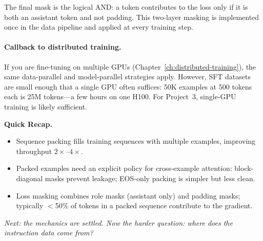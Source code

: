 The final mask is the logical AND: a token contributes to the loss only if it is both an assistant token and not padding. This two-layer masking is implemented once in the data pipeline and applied at every training step.

\noindent{}

\paragraph{Callback to distributed training.} If you are fine-tuning on multiple GPUs (Chapter~\ref{ch:distributed-training}), the same data-parallel and model-parallel strategies apply. However, SFT datasets are small enough that a single GPU often suffices: 50K examples at 500 tokens each is 25M tokens---a few hours on one H100. For Project~3, single-GPU training is likely sufficient.

\begin{quickrecap}
\textbf{Quick Recap.}
\begin{itemize}[nosep,leftmargin=1.5em]
  \item Sequence packing fills training sequences with multiple examples, improving throughput $2\times$--$4\times$.
  \item Packed examples need an explicit policy for cross-example attention: block-diagonal masks prevent leakage; EOS-only packing is simpler but less clean.
  \item Loss masking combines role masks (assistant only) and padding masks; typically $<$50\% of tokens in a packed sequence contribute to the gradient.
\end{itemize}
\textit{Next: the mechanics are settled. Now the harder question: where does the instruction data come from?}
\end{quickrecap}


